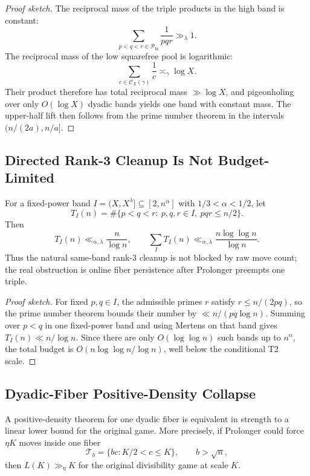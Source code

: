\begin{proof}[Proof sketch]
The reciprocal mass of the triple products in the high band is constant:
\[
\sum_{p<q<r\in \mathcal P_{\mathrm{hi}}}\frac1{pqr}\gg_\lambda 1.
\]
The reciprocal mass of the low squarefree pool is logarithmic:
\[
\sum_{c\in\mathcal C_X(\gamma)}\frac1c\asymp_\gamma \log X.
\]
Their product therefore has total reciprocal mass $\gg \log X$, and pigeonholing
over only $O(\log X)$ dyadic bands yields one band with constant mass.  The
upper-half lift then follows from the prime number theorem in the intervals
$(n/(2a),n/a]$.
\end{proof}

\subsection{Directed Rank-3 Cleanup Is Not Budget-Limited}

\begin{proposition}\label{prop:rank3-budget}
For a fixed-power band $I=(X,X^\lambda]\subseteq [2,n^\alpha]$ with
$1/3<\alpha<1/2$, let
\[
T_I(n)=\#\{p<q<r:\ p,q,r\in I,\ pqr\le n/2\}.
\]
Then
\[
T_I(n)\ll_{\alpha,\lambda}\frac{n}{\log n},
\qquad
\sum_I T_I(n)\ll_{\alpha,\lambda}\frac{n\log\log n}{\log n}.
\]
Thus the natural same-band rank-$3$ cleanup is not blocked by raw move count;
the real obstruction is online fiber persistence after Prolonger preempts one
triple.
\end{proposition}

\begin{proof}[Proof sketch]
For fixed $p,q\in I$, the admissible primes $r$ satisfy
$r\le n/(2pq)$, so the prime number theorem bounds their number by
$\ll n/(pq\log n)$.  Summing over $p<q$ in one fixed-power band and using
Mertens on that band gives $T_I(n)\ll n/\log n$.  Since there are only
$O(\log\log n)$ such bands up to $n^\alpha$, the total budget is
$O(n\log\log n/\log n)$, well below the conditional T2 scale.
\end{proof}

\subsection{Dyadic-Fiber Positive-Density Collapse}

\begin{proposition}\label{prop:dyadic-fiber-collapse}
A positive-density theorem for one dyadic fiber is equivalent in strength to a
linear lower bound for the original game.  More precisely, if Prolonger could
force $\eta K$ moves inside one fiber
\[
\mathcal T_b=\{bc:K/2<c\le K\},
\qquad
b>\sqrt n,
\]
then $L(K)\gg_\eta K$ for the original divisibility game at scale $K$.
\end{proposition}

